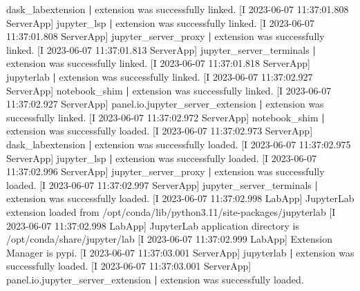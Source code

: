 \documentclass[
]{book}
\newenvironment{Shaded}{\begin{snugshade}}{\end{snugshade}}
\newcommand{\ExtensionTok}[1]{#1}
\newcommand{\KeywordTok}[1]{\textcolor[rgb]{0.13,0.29,0.53}{\textbf{#1}}}
\newcommand{\NormalTok}[1]{#1}
\newcommand{\StringTok}[1]{\textcolor[rgb]{0.31,0.60,0.02}{#1}}
\begin{document}
\begin{Shaded}
\begin{Highlighting}[]
\ExtensionTok{[I}\NormalTok{ 2023{-}06{-}07 11:37:01.808 ServerApp] dask\_labextension }\KeywordTok{|} \ExtensionTok{extension}\NormalTok{ was successfully linked.}
\ExtensionTok{[I}\NormalTok{ 2023{-}06{-}07 11:37:01.808 ServerApp] jupyter\_lsp }\KeywordTok{|} \ExtensionTok{extension}\NormalTok{ was successfully linked.}
\ExtensionTok{[I}\NormalTok{ 2023{-}06{-}07 11:37:01.808 ServerApp] jupyter\_server\_proxy }\KeywordTok{|} \ExtensionTok{extension}\NormalTok{ was successfully linked.}
\ExtensionTok{[I}\NormalTok{ 2023{-}06{-}07 11:37:01.813 ServerApp] jupyter\_server\_terminals }\KeywordTok{|} \ExtensionTok{extension}\NormalTok{ was successfully linked.}
\ExtensionTok{[I}\NormalTok{ 2023{-}06{-}07 11:37:01.818 ServerApp] jupyterlab }\KeywordTok{|} \ExtensionTok{extension}\NormalTok{ was successfully linked.}
\ExtensionTok{[I}\NormalTok{ 2023{-}06{-}07 11:37:02.927 ServerApp] notebook\_shim }\KeywordTok{|} \ExtensionTok{extension}\NormalTok{ was successfully linked.}
\ExtensionTok{[I}\NormalTok{ 2023{-}06{-}07 11:37:02.927 ServerApp] panel.io.jupyter\_server\_extension }\KeywordTok{|} \ExtensionTok{extension}\NormalTok{ was successfully linked.}
\ExtensionTok{[I}\NormalTok{ 2023{-}06{-}07 11:37:02.972 ServerApp] notebook\_shim }\KeywordTok{|} \ExtensionTok{extension}\NormalTok{ was successfully loaded.}
\ExtensionTok{[I}\NormalTok{ 2023{-}06{-}07 11:37:02.973 ServerApp] dask\_labextension }\KeywordTok{|} \ExtensionTok{extension}\NormalTok{ was successfully loaded.}
\ExtensionTok{[I}\NormalTok{ 2023{-}06{-}07 11:37:02.975 ServerApp] jupyter\_lsp }\KeywordTok{|} \ExtensionTok{extension}\NormalTok{ was successfully loaded.}
\ExtensionTok{[I}\NormalTok{ 2023{-}06{-}07 11:37:02.996 ServerApp] jupyter\_server\_proxy }\KeywordTok{|} \ExtensionTok{extension}\NormalTok{ was successfully loaded.}
\ExtensionTok{[I}\NormalTok{ 2023{-}06{-}07 11:37:02.997 ServerApp] jupyter\_server\_terminals }\KeywordTok{|} \ExtensionTok{extension}\NormalTok{ was successfully loaded.}
\ExtensionTok{[I}\NormalTok{ 2023{-}06{-}07 11:37:02.998 LabApp] JupyterLab extension loaded from /opt/conda/lib/python3.11/site{-}packages/jupyterlab}
\ExtensionTok{[I}\NormalTok{ 2023{-}06{-}07 11:37:02.998 LabApp] JupyterLab application directory is /opt/conda/share/jupyter/lab}
\ExtensionTok{[I}\NormalTok{ 2023{-}06{-}07 11:37:02.999 LabApp] Extension Manager is }\StringTok{\textquotesingle{}pypi\textquotesingle{}}\NormalTok{.}
\ExtensionTok{[I}\NormalTok{ 2023{-}06{-}07 11:37:03.001 ServerApp] jupyterlab }\KeywordTok{|} \ExtensionTok{extension}\NormalTok{ was successfully loaded.}
\ExtensionTok{[I}\NormalTok{ 2023{-}06{-}07 11:37:03.001 ServerApp] panel.io.jupyter\_server\_extension }\KeywordTok{|} \ExtensionTok{extension}\NormalTok{ was successfully loaded.}

\end{Highlighting}
\end{Shaded}
\end{document}
